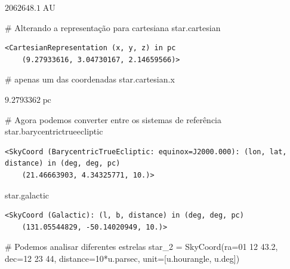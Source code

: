\documentclass[
  letterpaper,
  DIV=11,
  numbers=noendperiod]{scrreprt}
\newenvironment{Shaded}{\begin{snugshade}}{\end{snugshade}}
\newcommand{\CommentTok}[1]{\textcolor[rgb]{0.37,0.37,0.37}{#1}}
\newcommand{\DecValTok}[1]{\textcolor[rgb]{0.68,0.00,0.00}{#1}}
\newcommand{\NormalTok}[1]{\textcolor[rgb]{0.00,0.23,0.31}{#1}}
\newcommand{\OperatorTok}[1]{\textcolor[rgb]{0.37,0.37,0.37}{#1}}
\newcommand{\StringTok}[1]{\textcolor[rgb]{0.13,0.47,0.30}{#1}}
\begin{document}
$2062648.1 \; \mathrm{AU}$

\begin{Shaded}
\begin{Highlighting}[]
\CommentTok{\# Alterando a representação para cartesiana}
\NormalTok{star.cartesian}
\end{Highlighting}
\end{Shaded}

\begin{verbatim}
<CartesianRepresentation (x, y, z) in pc
    (9.27933616, 3.04730167, 2.14659566)>
\end{verbatim}

\begin{Shaded}
\begin{Highlighting}[]
\CommentTok{\# apenas um das coordenadas}
\NormalTok{star.cartesian.x}
\end{Highlighting}
\end{Shaded}

$9.2793362 \; \mathrm{pc}$

\begin{Shaded}
\begin{Highlighting}[]
\CommentTok{\# Agora podemos converter entre os sistemas de referência}
\NormalTok{star.barycentrictrueecliptic}
\end{Highlighting}
\end{Shaded}

\begin{verbatim}
<SkyCoord (BarycentricTrueEcliptic: equinox=J2000.000): (lon, lat, distance) in (deg, deg, pc)
    (21.46663903, 4.34325771, 10.)>
\end{verbatim}

\begin{Shaded}
\begin{Highlighting}[]
\NormalTok{star.galactic}
\end{Highlighting}
\end{Shaded}

\begin{verbatim}
<SkyCoord (Galactic): (l, b, distance) in (deg, deg, pc)
    (131.05544829, -50.14020949, 10.)>
\end{verbatim}

\begin{Shaded}
\begin{Highlighting}[]
\CommentTok{\# Podemos analisar diferentes estrelas}
\NormalTok{star\_2 }\OperatorTok{=}\NormalTok{ SkyCoord(ra}\OperatorTok{=}\StringTok{\textquotesingle{}01 12 43.2\textquotesingle{}}\NormalTok{, }
\NormalTok{                  dec}\OperatorTok{=}\StringTok{\textquotesingle{}{-}12 23 44\textquotesingle{}}\NormalTok{, }
\NormalTok{                  distance}\OperatorTok{=}\DecValTok{10}\OperatorTok{*}\NormalTok{u.parsec, }
\NormalTok{                  unit}\OperatorTok{=}\NormalTok{[u.hourangle, u.deg])}
\end{Highlighting}
\end{Shaded}
\end{document}
